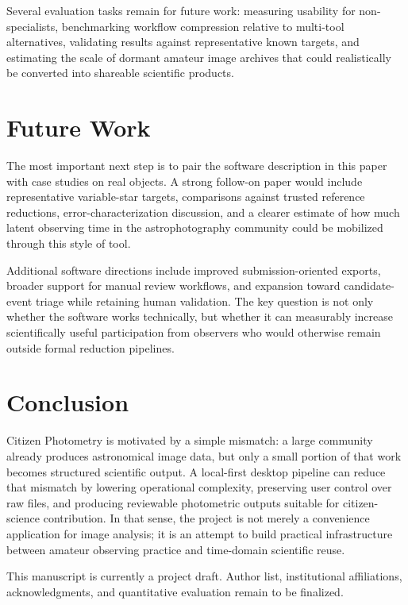 \documentclass[modern]{aastex701}
\begin{document}
Several evaluation tasks remain for future work: measuring usability for non-specialists, benchmarking workflow compression relative to multi-tool alternatives, validating results against representative known targets, and estimating the scale of dormant amateur image archives that could realistically be converted into shareable scientific products.

\section{Future Work}\label{sec:future}

The most important next step is to pair the software description in this paper with case studies on real objects. A strong follow-on paper would include representative variable-star targets, comparisons against trusted reference reductions, error-characterization discussion, and a clearer estimate of how much latent observing time in the astrophotography community could be mobilized through this style of tool.

Additional software directions include improved submission-oriented exports, broader support for manual review workflows, and expansion toward candidate-event triage while retaining human validation. The key question is not only whether the software works technically, but whether it can measurably increase scientifically useful participation from observers who would otherwise remain outside formal reduction pipelines.

\section{Conclusion}\label{sec:conclusion}

Citizen Photometry is motivated by a simple mismatch: a large community already produces astronomical image data, but only a small portion of that work becomes structured scientific output. A local-first desktop pipeline can reduce that mismatch by lowering operational complexity, preserving user control over raw files, and producing reviewable photometric outputs suitable for citizen-science contribution. In that sense, the project is not merely a convenience application for image analysis; it is an attempt to build practical infrastructure between amateur observing practice and time-domain scientific reuse.

\begin{acknowledgments}
This manuscript is currently a project draft. Author list, institutional affiliations, acknowledgments, and quantitative evaluation remain to be finalized.
\end{acknowledgments}




\end{document}
